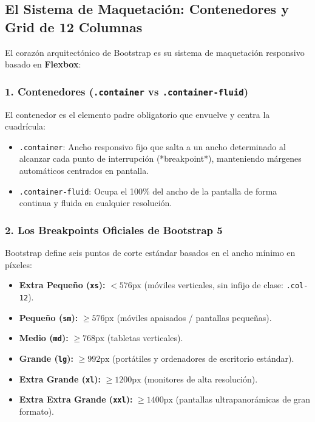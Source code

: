 \subsection{El Sistema de Maquetación: Contenedores y Grid de 12 Columnas}

El corazón arquitectónico de Bootstrap es su sistema de maquetación responsivo basado en \textbf{Flexbox}:

\subsubsection{1. Contenedores (\texttt{.container} vs \texttt{.container-fluid})}
El contenedor es el elemento padre obligatorio que envuelve y centra la cuadrícula:
\begin{itemize}[leftmargin=1.2cm]
  \item \texttt{.container}: Ancho responsivo fijo que salta a un ancho determinado al alcanzar cada punto de interrupción (*breakpoint*), manteniendo márgenes automáticos centrados en pantalla.
  \item \texttt{.container-fluid}: Ocupa el 100\% del ancho de la pantalla de forma continua y fluida en cualquier resolución.
\end{itemize}

\subsubsection{2. Los Breakpoints Oficiales de Bootstrap 5}
Bootstrap define seis puntos de corte estándar basados en el ancho mínimo en píxeles:
\begin{itemize}[leftmargin=1.2cm]
  \item \textbf{Extra Pequeño (\texttt{xs}):} $<576\text{px}$ (móviles verticales, sin infijo de clase: \texttt{.col-12}).
  \item \textbf{Pequeño (\texttt{sm}):} $\ge 576\text{px}$ (móviles apaisados / pantallas pequeñas).
  \item \textbf{Medio (\texttt{md}):} $\ge 768\text{px}$ (tabletas verticales).
  \item \textbf{Grande (\texttt{lg}):} $\ge 992\text{px}$ (portátiles y ordenadores de escritorio estándar).
  \item \textbf{Extra Grande (\texttt{xl}):} $\ge 1200\text{px}$ (monitores de alta resolución).
  \item \textbf{Extra Extra Grande (\texttt{xxl}):} $\ge 1400\text{px}$ (pantallas ultrapanorámicas de gran formato).
\end{itemize}

